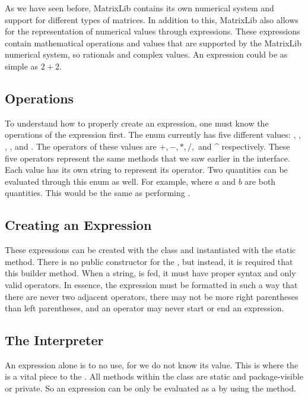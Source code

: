 As we have seen before, MatrixLib contains its own numerical system and support for different types of matrices.
In addition to this, MatrixLib also allows for the representation of numerical values through expressions.
These expressions contain mathematical operations and values that are supported by the MatrixLib numerical system, so rationals and complex values.
An expression could be as simple as $2+2$.

\subsection*{Operations}
To understand how to properly create an expression, one must know the operations of the expression first.
The  enum currently has five different values:
, , , , and .
The operators of these values are $+, -, *, /,$ and \^{} respectively.
These five operators represent the same methods that we saw earlier in the  interface.
Each  value has its own string to represent its operator.
Two quantities can be evaluated through this enum as well.
For example,  where $a$ and $b$ are both quantities.
This would be the same as performing .

\subsection*{Creating an Expression}
These expressions can be created with the  class and instantiated with the static  method.
There is no public constructor for the , but instead, it is required that this builder method.
When a string, is fed, it must have proper syntax and only valid operators.
In essence, the expression must be formatted in such a way that there are never two adjacent operators,
there may not be more right parentheses than left parentheses, and an operator may never start or end an expression.

\subsection*{The Interpreter}
An expression alone is to no use, for we do not know its value.
This is where the  is a vital piece to the .
All methods within the  class are static and package-visible or private.
So an expression can be only be evaluated as a  by using the  method.

